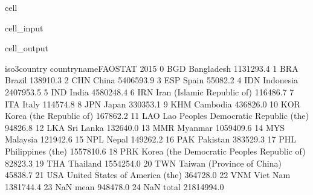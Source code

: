 \documentclass[letterpaper,10pt,english]{jupyterBook}
\begin{document}
\begin{sphinxuseclass}{cell}\begin{sphinxVerbatimInput}

\begin{sphinxuseclass}{cell_input}
\begin{sphinxVerbatim}[commandchars=\\\{\}]
\end{sphinxVerbatim}

\end{sphinxuseclass}\end{sphinxVerbatimInput}
\begin{sphinxVerbatimOutput}

\begin{sphinxuseclass}{cell_output}
\begin{sphinxVerbatim}[commandchars=\\\{\}]
   iso3\PYGZus{}country                         country\PYGZus{}name\PYGZus{}FAOSTAT        2015  \PYGZbs{}
0           BGD                                   Bangladesh   1131293.4   
1           BRA                                       Brazil    138910.3   
2           CHN                                        China   5406593.9   
3           ESP                                        Spain     55082.2   
4           IDN                                    Indonesia   2407953.5   
5           IND                                        India   4580248.4   
6           IRN                   Iran (Islamic Republic of)    116486.7   
7           ITA                                        Italy    114574.8   
8           JPN                                        Japan    330353.1   
9           KHM                                     Cambodia    436826.0   
10          KOR                      Korea (the Republic of)    167862.2   
11          LAO       Lao People\PYGZsq{}s Democratic Republic (the)     94826.8   
12          LKA                                    Sri Lanka    132640.0   
13          MMR                                      Myanmar   1059409.6   
14          MYS                                     Malaysia    121942.6   
15          NPL                                        Nepal    149262.2   
16          PAK                                     Pakistan    383529.3   
17          PHL                            Philippines (the)   1557810.6   
18          PRK  Korea (the Democratic People\PYGZsq{}s Republic of)     82823.3   
19          THA                                     Thailand   1554254.0   
20          TWN                   Taiwan (Province of China)     45838.7   
21          USA               United States of America (the)    364728.0   
22          VNM                                     Viet Nam   1381744.4   
23          NaN                                         mean    948478.0   
24          NaN                                        total  21814994.0   


\end{sphinxVerbatim}
\end{sphinxuseclass}
\end{sphinxVerbatimOutput}
\end{sphinxuseclass}
\end{document}
